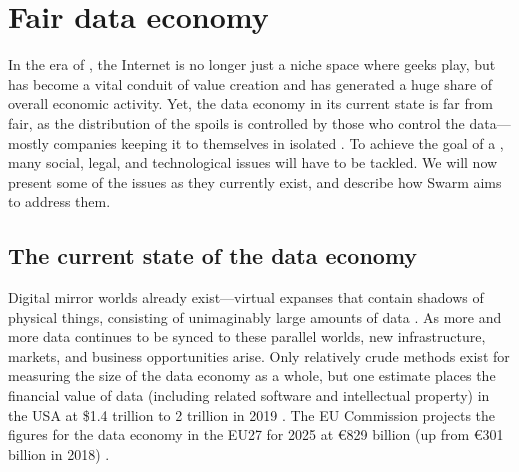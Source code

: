 \section{Fair data economy  \statusgreen}\label{sec:fair-data}
\green{}

In the era of , the Internet is no longer just a niche space where geeks play, but has become a vital conduit of value creation and has generated a huge share of overall economic activity. Yet, the data economy in its current state is far from fair, as the distribution of the spoils is controlled by those who control the data—mostly companies keeping it to themselves in isolated . To achieve the goal of a , many social, legal, and technological issues will have to be tackled. We will now present some of the issues as they currently exist, and describe how Swarm aims to address them. 

\subsection{The current state of the data economy  \statusgreen} \label{sec:dataeconomy}

Digital mirror worlds already exist---virtual expanses that contain shadows of physical things, consisting of unimaginably large amounts of data \cite{MirrorWorlds2020Feb}. As more and more data continues to be synced to these parallel worlds, new infrastructure, markets, and business opportunities arise. Only relatively crude methods exist for measuring the size of the data economy as a whole, but one estimate places the financial value of data (including related software and intellectual property) in the USA at \$1.4 trillion to 2 trillion in 2019 \cite{MirrorWorlds2020Feb}. The EU Commission projects the figures for the data economy in the EU27 for 2025 at €829 billion (up from €301 billion in 2018) \cite{EUDataStrategy2020Feb}. 

